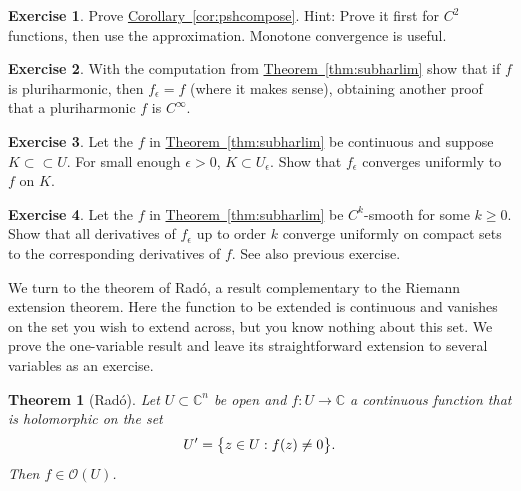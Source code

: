 \documentclass[12pt,openany]{book}
\newcommand{\avoidbreak}{\postdisplaypenalty=100}
\newcommand{\C}{{\mathbb{C}}}
\newcommand{\sO}{{\mathscr{O}}}
\theoremstyle{plain}
\newtheorem{thm}{Theorem}[section]
\theoremstyle{remark}
\theoremstyle{definition}
\newenvironment{exbox}{%
    \def\FrameCommand{\vrule width 1pt \relax\hspace{10pt}}%
    \MakeFramed{\advance\hsize-\width\FrameRestore}%
}{%
    \endMakeFramed
}
\theoremstyle{exercise}
\newtheorem{exercise}{Exercise}[section]
\theoremstyle{example}
\newcommand{\thmref}[1]{\hyperref[#1]{Theorem~\ref*{#1}}}
\newcommand{\corref}[1]{\hyperref[#1]{Corollary~\ref*{#1}}}
\begin{document}
\begin{exbox}
\begin{exercise}
Prove \corref{cor:pshcompose}.
Hint: Prove it first for $C^2$ functions,
then use the approximation.
Monotone convergence is useful.
\end{exercise}

\begin{exercise}
With the computation from
\thmref{thm:subharlim} show that if $f$ is pluriharmonic, then
$f_\epsilon = f$ (where it makes sense), obtaining another proof that
a pluriharmonic $f$ is $C^\infty$.
\end{exercise}

\begin{exercise}
Let the $f$ in \thmref{thm:subharlim} be continuous and suppose $K \subset
\subset U$.  For small enough $\epsilon >0$, $K \subset U_\epsilon$.
Show that $f_\epsilon$ converges uniformly to $f$ on $K$.
\end{exercise}

\begin{exercise}
Let the $f$ in \thmref{thm:subharlim} be $C^k$-smooth for some $k \geq 0$.
Show that all derivatives of $f_\epsilon$ up to order $k$ converge uniformly
on compact sets to the corresponding derivatives of $f$.  See also previous
exercise.
\end{exercise}
\end{exbox}

We turn to the theorem of
Rad\'o, a result complementary to the Riemann extension theorem.
Here the function to be extended is
continuous and vanishes on the set you wish to extend across,
but you know nothing about this set.
We prove the one-variable result and leave its straightforward
extension to several variables as an exercise.

\begin{thm}[Rad\'o] \label{thm:rado}
Let $U \subset \C^n$ be open and $f \colon U \to \C$ a continuous
function that is holomorphic on the set
\begin{equation*}
U' = \bigl\{ z \in U : f(z) \neq 0 \bigr\} .
\avoidbreak
\end{equation*}
Then $f \in \sO(U)$.
\end{thm}
\end{document}
